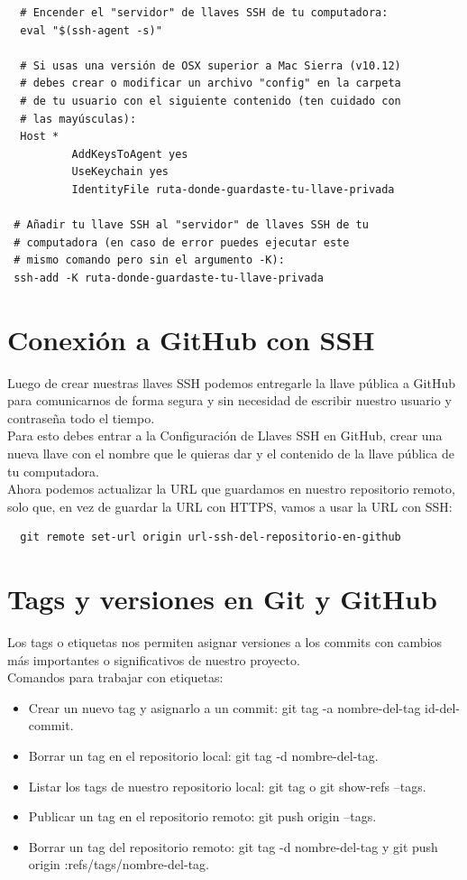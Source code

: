 \documentclass{article}
\begin{document}
\begin{verbatim}
  # Encender el "servidor" de llaves SSH de tu computadora:
  eval "$(ssh-agent -s)"

  # Si usas una versión de OSX superior a Mac Sierra (v10.12)
  # debes crear o modificar un archivo "config" en la carpeta
  # de tu usuario con el siguiente contenido (ten cuidado con
  # las mayúsculas):
  Host *
          AddKeysToAgent yes
          UseKeychain yes
          IdentityFile ruta-donde-guardaste-tu-llave-privada

 # Añadir tu llave SSH al "servidor" de llaves SSH de tu
 # computadora (en caso de error puedes ejecutar este
 # mismo comando pero sin el argumento -K):
 ssh-add -K ruta-donde-guardaste-tu-llave-privada
\end{verbatim}

\section{Conexión a GitHub con SSH}%
Luego de crear nuestras llaves SSH podemos entregarle la llave pública a GitHub
para comunicarnos de forma segura y sin necesidad de escribir nuestro usuario y
contraseña todo el tiempo.\\

Para esto debes entrar a la Configuración de Llaves SSH en GitHub, crear una
nueva llave con el nombre que le quieras dar y el contenido de la llave pública
de tu computadora.\\

Ahora podemos actualizar la URL que guardamos en nuestro repositorio remoto,
solo que, en vez de guardar la URL con HTTPS, vamos a usar la URL con SSH:\\

\begin{verbatim}
  git remote set-url origin url-ssh-del-repositorio-en-github
\end{verbatim}


\section{Tags y versiones en Git y GitHub}%
Los tags o etiquetas nos permiten asignar versiones a los commits con cambios
más importantes o significativos de nuestro proyecto.\\

Comandos para trabajar con etiquetas:

\begin{itemize}
  \item Crear un nuevo tag y asignarlo a un commit: git tag -a nombre-del-tag
    id-del-commit.
  \item Borrar un tag en el repositorio local: git tag -d nombre-del-tag.
  \item Listar los tags de nuestro repositorio local: git tag o git show-refs
    --tags.
  \item Publicar un tag en el repositorio remoto: git push origin --tags.
  \item Borrar un tag del repositorio remoto: git tag -d nombre-del-tag y git
    push origin :refs/tags/nombre-del-tag.
\end{itemize}
\end{document}
